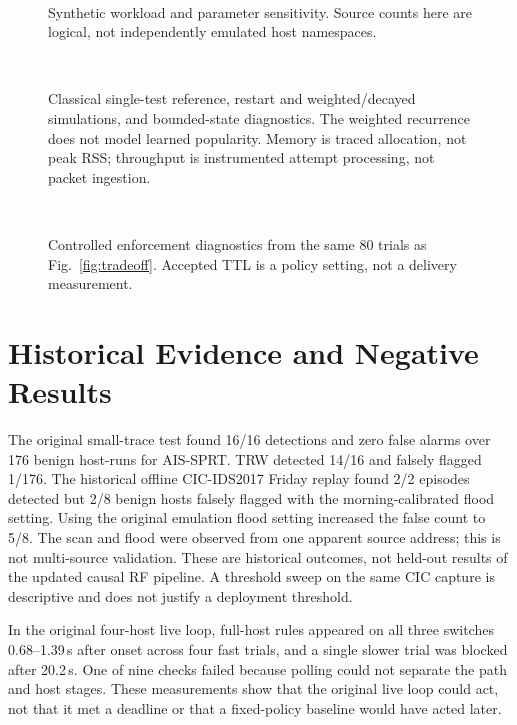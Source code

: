 \begin{figure}[!t]
\centering
{}\\
\caption{Synthetic workload and parameter sensitivity. Source counts here
are logical, not independently emulated host namespaces.}
\end{figure}

\begin{figure}[!t]
\centering
{}\\
\caption{Classical single-test reference, restart and weighted/decayed
simulations, and bounded-state diagnostics. The weighted recurrence does
not model learned popularity. Memory is traced allocation, not peak RSS;
throughput is instrumented attempt processing, not packet ingestion.}
\end{figure}

\begin{figure}[!t]
\centering
{}\\
\caption{Controlled enforcement diagnostics from the same 80 trials as
Fig.~\ref{fig:tradeoff}. Accepted TTL is a policy setting, not a delivery measurement.}
\end{figure}

\section{Historical Evidence and Negative Results}\label{app:historical}
The original small-trace test found 16/16 detections and zero false alarms
over 176 benign host-runs for AIS-SPRT. TRW detected 14/16 and falsely
flagged 1/176. The historical offline CIC-IDS2017 Friday replay found
2/2 episodes detected but 2/8 benign hosts falsely flagged with the
morning-calibrated flood setting. Using the original emulation flood
setting increased the false count to 5/8. The scan and flood were observed
from one apparent source address; this is not multi-source validation.
These are historical outcomes, not held-out results of the updated
causal RF pipeline. A threshold sweep on the same CIC capture is
descriptive and does not justify a deployment threshold.

In the original four-host live loop, full-host rules appeared on all
three switches 0.68--1.39\,s after onset across four fast trials, and a
single slower trial was blocked after 20.2\,s. One of nine checks failed
because polling could not separate the path and host stages. These
measurements show that the original live loop could act, not that it met
a deadline or that a fixed-policy baseline would have acted later.


